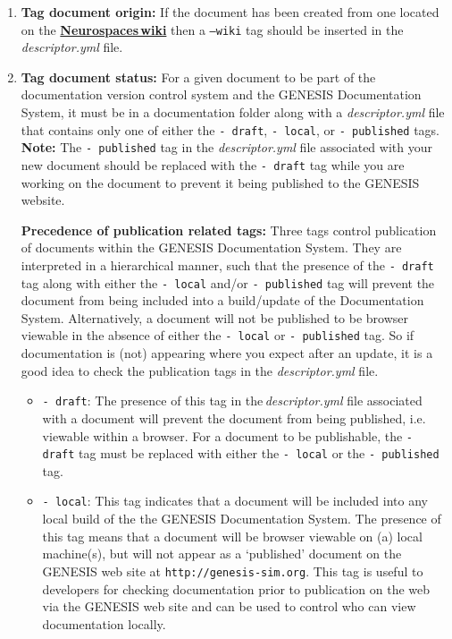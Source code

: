 \documentclass[12pt]{article}
\begin{document}
\begin{enumerate}
\begin{enumerate}
\item {\bf Tag document origin:} If the document has been created from one located on the \href{http://code.google.com/p/neurospaces/w/list}{\bf Neurospaces\,wiki} then a {\tt --wiki} tag should be inserted in the {\it descriptor.yml} file.

\item {\bf Tag document status:} For a given document to be part of the documentation version control system and the GENESIS Documentation System, it must be in a documentation folder along with a {\it descriptor.yml} file that contains only one of either the {\tt -\,draft}, {\tt -\,local}, or {\tt -\,published} tags. {\bf Note:} The {\tt-\,published} tag in the {\it descriptor.yml} file associated with your new document should be replaced with the {\tt -\,draft} tag  while you are working on the document to prevent it being published to the GENESIS website. 

{\bf Precedence of publication related tags:} Three tags control publication of documents within the GENESIS Documentation System. They are interpreted in a hierarchical manner, such that the presence of the {\tt  -\,draft} tag along with either the {\tt -\,local} and/or {\tt -\,published} tag will prevent the document from being included into a build/update of the Documentation System. Alternatively, a document will not be published to be browser viewable in the absence of either the {\tt -\,local} or {\tt -\,published} tag. So if documentation is (not) appearing where you expect after an update, it is a good idea to check the publication tags in the {\it descriptor.yml} file.

\begin{itemize}
	\item[]{\tt -\,draft}: The presence of this tag in the\,{\it descriptor.yml} file associated with a document will prevent the document 
	from being published,  i.e. viewable within a browser. For a document to be publishable, the {\tt -\,draft} tag must be replaced 
	with either the {\tt -\,local} or the {\tt -\,published} tag.
	
	\item[]{\tt -\,local}: This tag indicates that a document will be included into any local build of the the GENESIS Documentation 
	System. The presence of this tag means that a document will be browser viewable on (a) local machine(s), but will not appear as a 
	`published' document on the GENESIS web site at {\tt http://genesis-sim.org}. This tag is useful to developers for checking documentation
	prior to publication on the web via the GENESIS web site and can be used to control who can view documentation locally.
	

\end{itemize}
\end{enumerate}
\end{enumerate}
\end{document}
